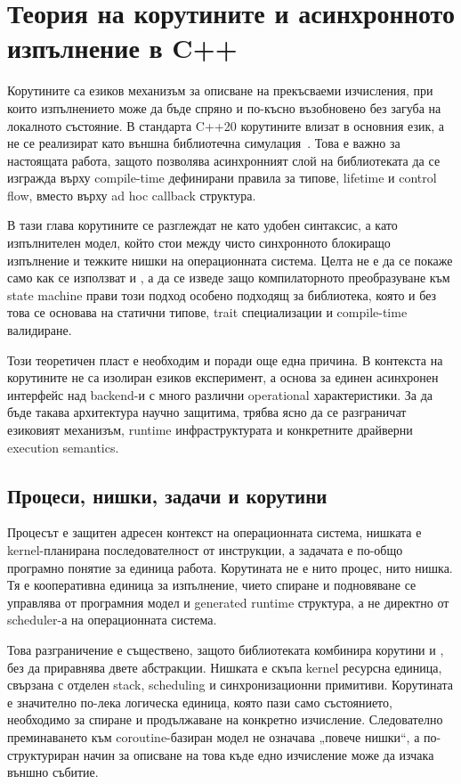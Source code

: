 \section{Теория на корутините и асинхронното изпълнение в C++}
\label{sec:coroutines_async_theory}

Корутините са езиков механизъм за описване на прекъсваеми изчисления, при които изпълнението може да бъде спряно и по-късно възобновено без загуба на локалното състояние. В стандарта C++20 корутините влизат в основния език, а не се реализират като външна библиотечна симулация~\cite{cpp20standard,p0912r5,p1063r0}. Това е важно за настоящата работа, защото позволява асинхронният слой на библиотеката да се изгражда върху compile-time дефинирани правила за типове, lifetime и control flow, вместо върху ad hoc callback структура.

В тази глава корутините се разглеждат не като удобен синтаксис, а като изпълнителен модел, който стои между чисто синхронното блокиращо изпълнение и тежките нишки на операционната система. Целта не е да се покаже само как се използват  и , а да се изведе защо компилаторното преобразуване към state machine прави този подход особено подходящ за библиотека, която и без това се основава на статични типове, trait специализации и compile-time валидиране.

Този теоретичен пласт е необходим и поради още една причина. В контекста на \ORMName{} корутините не са изолиран езиков експеримент, а основа за единен асинхронен интерфейс над backend-и с много различни operational характеристики. За да бъде такава архитектура научно защитима, трябва ясно да се разграничат езиковият механизъм, runtime инфраструктурата и конкретните драйверни execution semantics.

\subsection{Процеси, нишки, задачи и корутини}

Процесът е защитен адресен контекст на операционната система, нишката е kernel-планирана последователност от инструкции, а задачата е по-общо програмно понятие за единица работа. Корутината не е нито процес, нито нишка. Тя е кооперативна единица за изпълнение, чието спиране и подновяване се управлява от програмния модел и generated runtime структура, а не директно от scheduler-а на операционната система.

Това разграничение е съществено, защото библиотеката комбинира корутини и , без да приравнява двете абстракции. Нишката е скъпа kernel ресурсна единица, свързана с отделен stack, scheduling и синхронизационни примитиви. Корутината е значително по-лека логическа единица, която пази само състоянието, необходимо за спиране и продължаване на конкретно изчисление. Следователно преминаването към coroutine-базиран модел не означава „повече нишки“, а по-структуриран начин за описване на това къде едно изчисление може да изчака външно събитие.

